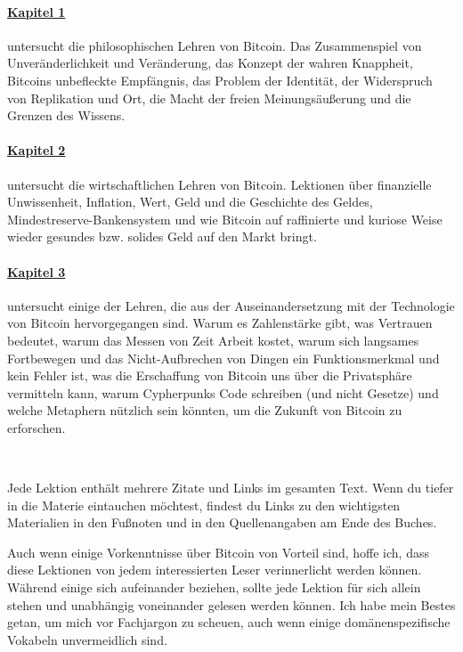 \paragraph{\hyperref[ch:philosophy]{Kapitel 1}} untersucht die philosophischen
Lehren von Bitcoin. Das Zusammenspiel von Unveränderlichkeit und Veränderung,
das Konzept der wahren Knappheit, Bitcoins unbefleckte Empfängnis, das Problem
der Identität, der Widerspruch von Replikation und Ort, die Macht der freien
Meinungsäußerung und die Grenzen des Wissens.

\paragraph{\hyperref[ch:economics]{Kapitel 2}} untersucht die wirtschaftlichen
Lehren von Bitcoin. Lektionen über finanzielle Unwissenheit, Inflation, Wert,
Geld und die Geschichte des Geldes, Mindestreserve-Bankensystem und wie Bitcoin
auf raffinierte und kuriose Weise wieder gesundes bzw. solides Geld auf den
Markt bringt.

\paragraph{\hyperref[ch:technology]{Kapitel 3}} untersucht einige der Lehren,
die aus der Auseinandersetzung mit der Technologie von Bitcoin hervorgegangen
sind. Warum es Zahlenstärke gibt, was Vertrauen bedeutet, warum das Messen von
Zeit Arbeit kostet, warum sich langsames Fortbewegen und das Nicht-Aufbrechen
von Dingen ein Funktionsmerkmal und kein Fehler ist, was die Erschaffung von
Bitcoin uns über die Privatsphäre vermitteln kann, warum Cypherpunks Code
schreiben (und nicht Gesetze) und welche Metaphern nützlich sein könnten, um die
Zukunft von Bitcoin zu erforschen.

~

Jede Lektion enthält mehrere Zitate und Links im gesamten Text. Wenn du tiefer
in die Materie eintauchen möchtest, findest du Links zu den wichtigsten
Materialien in den Fußnoten und in den Quellenangaben am Ende des Buches.

Auch wenn einige Vorkenntnisse über Bitcoin von Vorteil sind, hoffe ich, dass
diese Lektionen von jedem interessierten Leser verinnerlicht werden können.
Während einige sich aufeinander beziehen, sollte jede Lektion für sich allein
stehen und unabhängig voneinander gelesen werden können. Ich habe mein Bestes
getan, um mich vor Fachjargon zu scheuen, auch wenn einige domänenspezifische
Vokabeln unvermeidlich sind.

